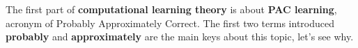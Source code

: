 The first part of \textbf{computational learning theory} is about \textbf{PAC learning}, acronym of Probably Approximately Correct. The first two terms 
introduced \textbf{probably} and \textbf{approximately} are the main keys about this topic, let's see why.
